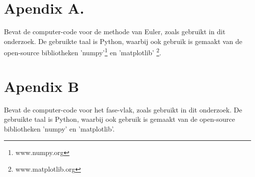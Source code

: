 

\chapter*{Apendix A.}
Bevat de computer-code voor de methode van Euler, zoals gebruikt in dit onderzoek. De gebruikte taal is Python, waarbij ook gebruik is gemaakt van de open-source bibliotheken 'numpy'\footnote{www.numpy.org} en 'matplotlib' \footnote{www.matplotlib.org}.



\newpage

\chapter*{Apendix B}
Bevat de computer-code voor het fase-vlak, zoals gebruikt in dit onderzoek. De gebruikte taal is Python, waarbij ook gebruik is gemaakt van de open-source bibliotheken 'numpy' en 'matplotlib'.


